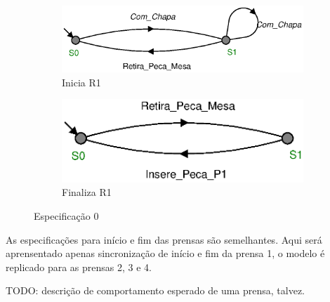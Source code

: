 \begin{figure}[H]%
  \centering
  \begin{subfigure}[b]{0.45\textwidth}
      \centering
      \includegraphics[width=\textwidth]{imagens/E0_inicia_R1.eps}
      \caption{Inicia R1}
      \label{fig:e0a}
  \end{subfigure}
  \hfill
  \begin{subfigure}[b]{0.45\textwidth}
      \centering
      \includegraphics[width=\textwidth]{imagens/E0_finaliza_R1.eps}
      \caption{Finaliza R1}
      \label{fig:e0b}
  \end{subfigure}
  \caption{Especificação 0}
  \label{fig:e0}
\end{figure}

As especificações para início e fim das prensas são semelhantes.
Aqui será aprensentado apenas sincronização de início e fim da prensa 1, o modelo é replicado para as prensas 2, 3 e 4.

TODO: descrição de comportamento esperado de uma prensa, talvez.

